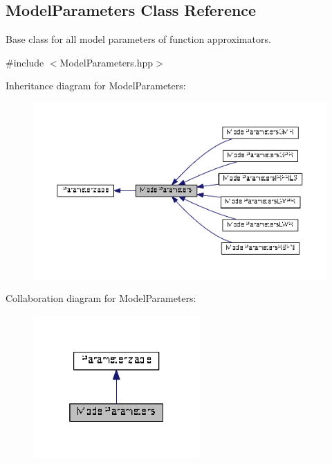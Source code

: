 \hypertarget{classDmpBbo_1_1ModelParameters}{\subsection{Model\+Parameters Class Reference}
\label{classDmpBbo_1_1ModelParameters}
}


Base class for all model parameters of function approximators.  




{\ttfamily \#include $<$Model\+Parameters.\+hpp$>$}



Inheritance diagram for Model\+Parameters\+:
\nopagebreak
\begin{figure}[H]
\begin{center}
\leavevmode
\includegraphics[width=350pt]{classDmpBbo_1_1ModelParameters__inherit__graph}
\end{center}
\end{figure}


Collaboration diagram for Model\+Parameters\+:
\nopagebreak
\begin{figure}[H]
\begin{center}
\leavevmode
\includegraphics[width=181pt]{classDmpBbo_1_1ModelParameters__coll__graph}
\end{center}
\end{figure}
